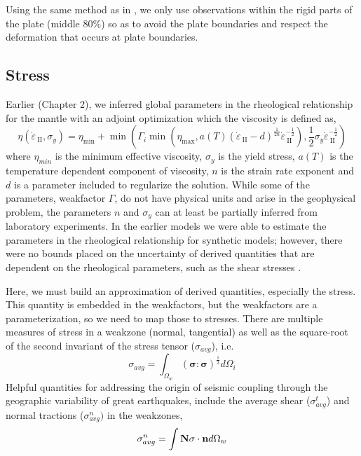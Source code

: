 \documentclass[12pt]{article}
\newcommand{\IIinv}{{\dot\varepsilon}_{\mathrm{\!\!\:II}}}
\newcommand{\ssigma}{{\ensuremath{\boldsymbol{\sigma}}}}
\begin{document}
Using the same method as in \citep{ratnaswamy2015adjoint}, we only use observations within the rigid parts of the plate (middle 80$\%$) so as to avoid the plate boundaries and respect the deformation that occurs at plate boundaries. 


\subsection*{Stress}
Earlier (Chapter 2), we inferred global parameters in the rheological relationship for the mantle with an adjoint optimization which the viscosity is defined as,
  \begin{equation}
    \eta(\IIinv,\sigma_{y}) =
\eta_{\min} + \min(\Gamma_i\min(\eta_{\max},a(T)(\IIinv-d)^{\frac{1}{2n}}\IIinv^{-\frac{1}{2}}),
\frac{1}{2}\sigma_y\IIinv^{-\frac{1}{2}})
\label{eq:rheo}
  \end{equation}
where $\eta_{min}$ is the minimum effective viscosity, $\sigma_y$ is the yield stress, $a(T)$ is the temperature dependent component of viscosity, $n$ is the strain rate exponent and $d$ is a parameter included to regularize the solution. While some of the parameters, weakfactor $\Gamma$, do not have physical units and arise in the geophysical problem, the parameters  $n$ and $\sigma_y$ can at least be partially inferred from laboratory experiments\citep{korenaga2008new}. In the earlier models we were able to estimate the parameters in the rheological relationship for synthetic models; however, there were no bounds placed on the uncertainty of derived quantities that are dependent on the rheological parameters, such as the shear stresses \citep{ratnaswamy2015adjoint}. %

 Here, we must build an approximation of derived quantities, especially the stress. This quantity is embedded in the weakfactors, but the weakfactors are a parameterization, so we need to map those to stresses.
There are multiple measures of stress in a weakzone (normal, tangential) as well as the square-root of the second invariant of the stress tensor ($\sigma_{avg}$), i.e. 
\begin{equation}
\sigma_{avg} = \int_{\Omega_w} (\ssigma:\ssigma)^{\frac{1}{2}} d\Omega_i
\end{equation}
Helpful quantities for addressing the origin of seismic coupling through the geographic variability of great earthquakes, include the average shear ($\sigma^t_{avg}$) and normal tractions ($\sigma^n_{avg})$ in the weakzones,
\begin{equation}
\sigma^n_{avg} = \int \textbf N \sigma\cdot\textbf n d\Omega_w
\end{equation}
\end{document}
